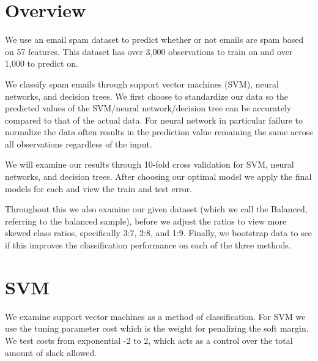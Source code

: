 \documentclass[10pt,a4paper, hidelinks]{article} %
\begin{document}
\pagestyle{plain} 
\title{\rmfamily\normalfont{}}
\date{\today} %

\maketitle
\section{Overview}

We use an email spam dataset to predict whether or not emails are spam based on 57 features. This dataset has over 3,000 observations to train on and over 1,000 to predict on.

We classify spam emails through support vector machines (SVM), neural networks, and decision trees. We first choose to standardize our data so the predicted values of the SVM/neural network/decision tree can be accurately compared to that of the actual data. For neural network in particular failure to normalize the data often results in the prediction value remaining the same across all observations regardless of the input.

We will examine our results through 10-fold cross validation for SVM, neural networks, and decision trees. After choosing our optimal model we apply the final models for each and view the train and test error.

Throughout this we also examine our given dataset (which we call the Balanced, referring to the balanced sample), before we adjust the ratios to view more skewed class ratios, specifically 3:7, 2:8, and 1:9. Finally, we bootstrap data to see if this improves the classification performance on each of the three methods. 

\newcommand{\myx}{\underset{\sim}{x}}
\newcommand{\myy}{\underset{\sim}{y}}
\newcommand{\myz}{\underset{\sim}{z}}
\newcommand{\myt}{\tilde{T}}

\section{SVM}

We examine support vector machines as a method of classification. For SVM we use the tuning parameter cost which is the weight for penalizing the soft margin. We test costs from exponential -2 to 2, which acts as a control over the total amount of slack allowed. 
\end{document}
